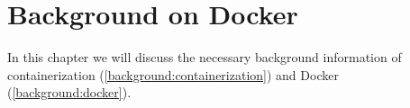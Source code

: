 \chapter{Background on Docker}\label{chapter:background}
In this chapter we will discuss the necessary background information of containerization (\autoref{background:containerization}) and Docker (\autoref{background:docker}).


